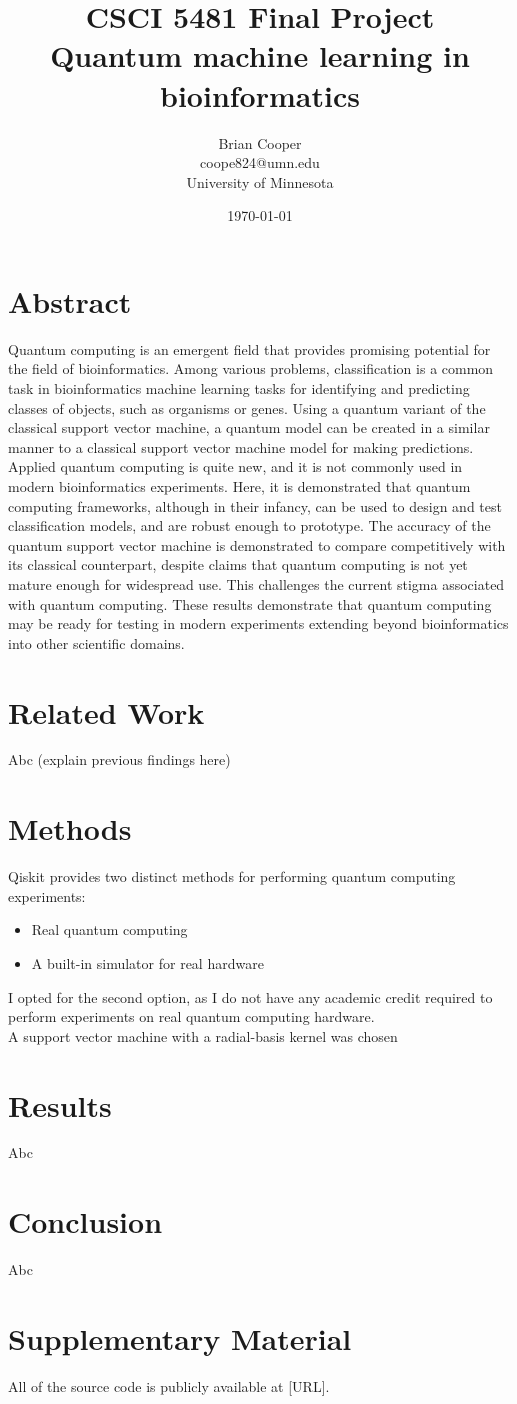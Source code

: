 \documentclass{article}
\title{%
  CSCI 5481 Final Project \\
  \large Quantum machine learning in bioinformatics
}
\author{Brian Cooper \\ coope824@umn.edu \\ University of Minnesota}
\date{\today}
\begin{document}
\maketitle

\section{Abstract}
  Quantum computing is an emergent field that provides promising potential for the field of bioinformatics. Among various problems, classification is a common task in bioinformatics machine learning tasks for identifying and predicting classes of objects, such as organisms or genes. Using a quantum variant of the classical support vector machine, a quantum model can be created in a similar manner to a classical support vector machine model for making predictions. Applied quantum computing is quite new, and it is not commonly used in modern bioinformatics experiments. Here, it is demonstrated that quantum computing frameworks, although in their infancy, can be used to design and test classification models, and are robust enough to prototype. The accuracy of the quantum support vector machine is demonstrated to compare competitively with its classical counterpart, despite claims that quantum computing is not yet mature enough for widespread use. This challenges the current stigma associated with quantum computing. These results demonstrate that quantum computing may be ready for testing in modern experiments extending beyond bioinformatics into other scientific domains.

\section{Related Work}
  Abc (explain previous findings here)

\section{Methods}
  Qiskit provides two distinct methods for performing quantum computing experiments:

  \begin{itemize}
    \item{Real quantum computing}
    \item{A built-in simulator for real hardware}
  \end{itemize}

  I opted for the second option, as I do not have any academic credit required to perform experiments on real quantum computing hardware. \\

  A support vector machine with a radial-basis kernel was chosen

\section{Results}
  Abc

\section{Conclusion}
  Abc

\section{Supplementary Material}
All of the source code is publicly available at [URL].
\end{document}
